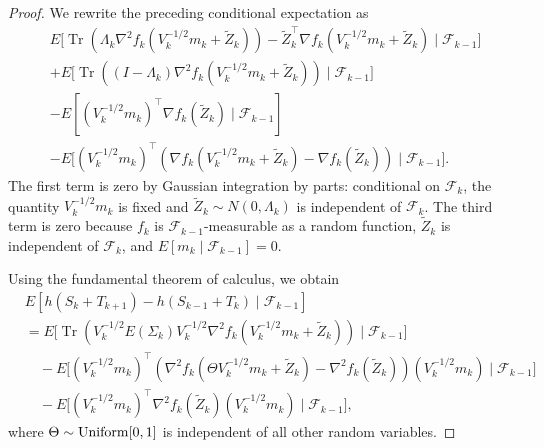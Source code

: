 \documentclass[11pt]{article}
\begin{document}
\begin{proof}
We rewrite the preceding conditional expectation as
\begin{align*}
& E\biggl[
\operatorname{Tr}\left(
\Lambda_k
\nabla^2 f_k\left(V_k^{-1/2}m_k+\widetilde Z_k\right)
\right)
-
\widetilde Z_k^\top
\nabla f_k\left(V_k^{-1/2}m_k+\widetilde Z_k\right)
\mid
\mathcal F_{k-1}
\biggr]
\\
&+
E\biggl[
\operatorname{Tr}\left(
(I-\Lambda_k)
\nabla^2 f_k\left(V_k^{-1/2}m_k+\widetilde Z_k\right)
\right)
\mid
\mathcal F_{k-1}
\biggr]
\\
&-
E\left[
(V_k^{-1/2}m_k)^\top\nabla f_k(\widetilde Z_k)
\mid
\mathcal F_{k-1}
\right]
\\
&-
E\biggl[
(V_k^{-1/2}m_k)^\top
\left(
\nabla f_k\left(V_k^{-1/2}m_k+\widetilde Z_k\right)
-
\nabla f_k(\widetilde Z_k)
\right)
\mid
\mathcal F_{k-1}
\biggr].
\end{align*}
The first term is zero by Gaussian integration by parts: conditional on
$\mathcal F_k$, the quantity $V_k^{-1/2}m_k$ is fixed and
$\widetilde Z_k\sim N(0,\Lambda_k)$ is independent of $\mathcal F_k$. The third term is zero because $f_k$ is $\mathcal F_{k-1}$-measurable as a
random function, $\widetilde Z_k$ is independent of $\mathcal F_k$, and
$E[m_k\mid\mathcal F_{k-1}]=0$.

Using the fundamental theorem of calculus, we obtain
\begin{align*}
& E\left[
h(S_k+T_{k+1})-h(S_{k-1}+T_k)
\mid
\mathcal F_{k-1}
\right]
\\
&=
E\biggl[
\operatorname{Tr}\left(
V_k^{-1/2}E(\Sigma_k)V_k^{-1/2}
\nabla^2 f_k\left(V_k^{-1/2}m_k+\widetilde Z_k\right)
\right)
\mid
\mathcal F_{k-1}
\biggr]
\\
&\quad
-
E\biggl[
(V_k^{-1/2}m_k)^\top
\left(
\nabla^2 f_k(\Theta V_k^{-1/2}m_k+\widetilde Z_k)
-
\nabla^2 f_k(\widetilde Z_k)
\right)
(V_k^{-1/2}m_k)
\mid
\mathcal F_{k-1}
\biggr]
\\
&\quad
-
E\biggl[
(V_k^{-1/2}m_k)^\top
\nabla^2 f_k(\widetilde Z_k)
(V_k^{-1/2}m_k)
\mid
\mathcal F_{k-1}
\biggr],
\end{align*}
where \(\Theta\sim {\rm Uniform}[0,1]\) is independent of all other random
variables.


\end{proof}
\end{document}
